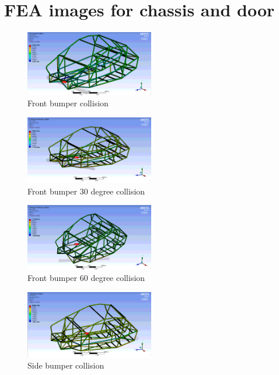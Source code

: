 \documentclass[10pt]{article}
\begin{document}
\clearpage
\section{FEA images for chassis and door}
\label{sec:fea-chassis-door-images}

\begin{figure}[H]
\centering
\includegraphics[width=0.5\textwidth]{figures/fea/chassis/chassis-collision-bumper-front}
\caption{Front bumper collision}
\label{fig:chassis-collision-bumper-front}
\end{figure}

\begin{figure}[H]
\centering
\includegraphics[width=0.5\textwidth]{figures/fea/chassis/chassis-collision-bumper-30deg}
\caption{Front bumper 30 degree collision}
\label{fig:chassis-collision-bumper-30deg}
\end{figure}

\begin{figure}[H]
\centering
\includegraphics[width=0.5\textwidth]{figures/fea/chassis/chassis-collision-bumper-60deg}
\caption{Front bumper 60 degree collision}
\label{fig:chassis-collision-bumper-60deg}
\end{figure}

\begin{figure}[H]
\centering
\includegraphics[width=0.5\textwidth]{figures/fea/chassis/chassis-collision-bumper-side}
\caption{Side bumper collision}
\label{fig:chassis-collision-bumper-side}
\end{figure}
\end{document}
